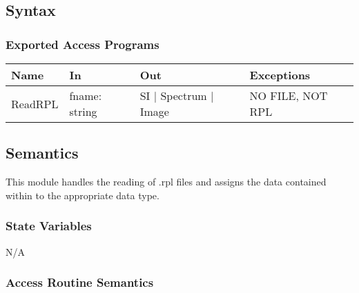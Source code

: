 \documentclass[12pt, titlepage]{article}
\begin{document}
\subsection{Syntax}

\subsubsection{Exported Access Programs}

\begin{center}
    \begin{tabular}{p{2cm} p{4cm} p{4cm} p{2cm}}
        \hline
        \textbf{Name} & \textbf{In} & \textbf{Out} & \textbf{Exceptions} \\
        \hline
        ReadRPL & fname: string & SI $|$ Spectrum $|$ Image & NO FILE, NOT RPL \\
        \hline
    \end{tabular}
\end{center}

\subsection{Semantics}
This module handles the reading of .rpl files and assigns the data contained
within to the appropriate data type.

\subsubsection{State Variables}
N/A

\subsubsection{Access Routine Semantics}
\end{document}
